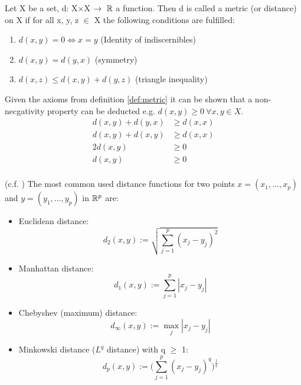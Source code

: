 \begin{definition}\label{def:metric} Let X be a set, d: X$\times$X $\rightarrow~\mathbb{R}$ a function. Then d is called a metric (or distance) on X if for all x, y, z $\in$ X the following conditions are fulfilled: 
\begin{enumerate}[label=(\subscript{D}{\arabic*})]
	\item\label{itm:namee} $d(x,y) = 0 \Leftrightarrow x = y$ \hfill (Identity of indiscernibles)
	\item $d(x,y) = d(y,x)$  \hfill (symmetry)
	\item $d(x,z) \leq d(x,y) + d(y,z)$ \hfill (triangle inequality)
\end{enumerate}

\begin{remark}
	Given the axioms from definition \ref{def:metric} it can be shown that a non-necgativity property can be deducted e.g. $d(x,y) \geq 0 ~\forall x,y \in X$.
	\begin{equation*}
	\begin{split}
		d(x,y) + d(y,x) & \geq d(x,x) \\
		d(x,y) + d(x,y) & \geq d(x,x) \\
		2d(x,y)         & \geq 0      \\
		d(x,y)          & \geq 0      \\
	\end{split}
	\end{equation*}
\end{remark}


\begin{example}(c.f. \cite{analysis_1}) The most common used distance functions for two points $x=(x_1, ..., x_p)$ and  $y=(y_1, ..., y_p)$ in $\mathbb{R}^p$ are: 
	\begin{itemize}[label=$\star$]
		\item Euclidean distance:
			\begin{equation*}
				d_2(x,y) := \sqrt{\sum_{j=1}^p(x_j - y_j)^2}
			\end{equation*}
		\item Manhattan distance:
			\begin{equation*}
				d_1(x,y) := \sum_{j=1}^p|x_j - y_j|
			\end{equation*}
		\item Chebyshev (maximum) distance:
			\begin{equation*}
				d_\infty(x,y) := \max_j|x_j - y_j|
			\end{equation*}		
		\item Minkowski distance ($L^q$ distance) with q $\geq$ 1:
			\begin{equation*}
				d_p(x,y) := \bigg(\sum_{j=1}^p(x_j - y_j)^q\bigg)^{\frac{1}{q}}
			\end{equation*}	
	\end{itemize}
\end{example}

\end{definition}

